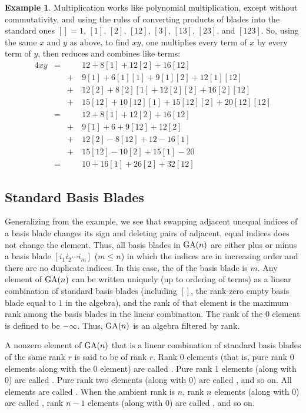 \documentclass{amsproc}
\theoremstyle{definition}
\newtheorem{example}[theorem]{Example}
\theoremstyle{remark}
\numberwithin{equation}{section}
\begin{document}
\begin{example}
Multiplication works like polynomial multiplication, except without
commutativity, and using the rules of converting products of blades
into the standard ones $[]=1$, $[1]$, $[2]$, $[12]$, $[3]$, $[13]$,
$[23]$, and $[123]$.  So, using the same $x$ and $y$ as above, to find
$xy$, one multiplies every term of $x$ by every term of $y$, then
reduces and combines like terms:
\begin{alignat*}{4}
  xy &=&&12 + 8[1] + 12[2] +16[12]\\
  && +~ & 9[1] + 6[1][1] + 9[1][2] + 12[1][12]\\
  && +~ & 12[2] + 8[2][1] + 12[2][2] + 16[2][12]\\
  && +~ & 15[12] + 10[12][1] + 15[12][2] + 20[12][12]\\
  &=&&12 + 8[1] + 12[2] + 16[12]\\
  && +~ &9[1] + 6 + 9[12] + 12[2]\\
  && +~ & 12[2] - 8[12] + 12 - 16[1]\\
  && +~ & 15[12] - 10[2] + 15[1] - 20\\
  &=&& 10 + 16[1] + 26[2] + 32[12]
\end{alignat*}
\end{example}

\subsection{Standard Basis Blades}

Generalizing from the example, we see that swapping adjacent unequal
indices of a basis blade changes its sign and deleting pairs of
adjacent, equal indices does not change the element.  Thus, all basis
blades in $\mathop{\mathrm{GA}}(n)$ are either plus or minus a  basis
blade $[i_1i_2\cdots{i}_m]$ ($m \le n$) in which the indices are in
increasing order and there are no duplicate indices.  In this case,
the  of the basis blade is $m$.  Any element of $\mathop{\mathrm{GA}}(n)$
can be written uniquely (up to ordering of terms) as a linear
combination of standard basis blades (including $[]$, the rank-zero
empty basis blade equal to $1$ in the algebra), and the rank of that
element is the maximum rank among the basis blades in the linear
combination.  The rank of the $0$ element is defined to be $-\infty$.
Thus, $\mathop{\mathrm{GA}}(n)$ is an algebra filtered by rank.

A nonzero element of $\mathop{\mathrm{GA}}(n)$ that is a linear combination of standard
basis blades of the same rank $r$ is said to be  of rank
$r$.  Rank 0 elements (that is, pure rank 0 elements along with the 0
element) are called .  Pure rank 1 elements (along with
0) are called .  Pure rank two elements (along with 0)
are called , and so on.  All elements are called
. When the ambient rank is $n$, rank $n$ elements
(along with 0) are called , rank $n-1$ elements
(along with 0) are called , and so on.
\end{document}
